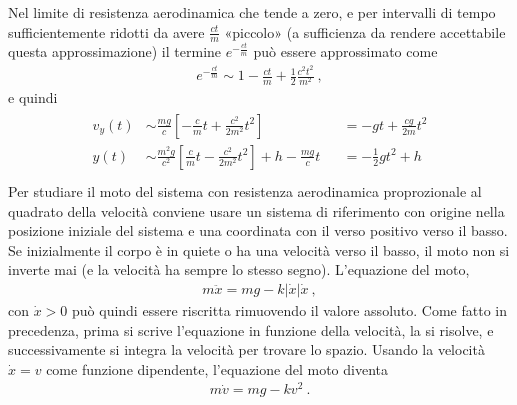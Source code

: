 \documentclass[letterpaper,10pt,italian]{jupyterBook}
\begin{document}
\sphinxAtStartPar
{} Nel limite di resistenza aerodinamica che tende a zero, e per intervalli di tempo sufficientemente ridotti da avere \(\frac{ct}{m}\) «piccolo» (a sufficienza da rendere accettabile questa approssimazione) il termine \(e^{-\frac{ct}{m}}\) può essere approssimato come
\begin{equation*}
\begin{split}e^{-\frac{ct}{m}} \sim 1 - \frac{ct}{m} + \frac{1}{2} \frac{c^2 t^2}{m^2} \ ,\end{split}
\end{equation*}
\sphinxAtStartPar
e quindi
\begin{equation*}
\begin{split}\begin{aligned}
  v_y(t) & \sim \frac{m g}{c} \left[ -\frac{c}{m} t + \frac{c^2}{2 m^2} t^2 \right] && = - g t + \frac{cg}{2m} t^2 \\
    y(t) & \sim \frac{m^2 g}{c^2} \left[ \frac{c}{m} t - \frac{c^2}{2 m^2} t^2 \right] + h - \frac{mg}{c}t && = - \frac{1}{2} g t^2 + h \\
\end{aligned}\end{split}
\end{equation*}
\sphinxAtStartPar
{}
Per studiare il moto del sistema con resistenza aerodinamica proprozionale al quadrato della velocità conviene usare un sistema di riferimento con origine nella posizione iniziale del sistema e una coordinata con il verso positivo verso il basso. Se inizialmente il corpo è in quiete o ha una velocità verso il basso, il moto non si inverte mai (e la velocità ha sempre lo stesso segno). L’equazione del moto,
\begin{equation*}
\begin{split}m \ddot{x} = m g - k |\dot{x}| \dot{x} \ ,\end{split}
\end{equation*}
\sphinxAtStartPar
con \(\dot{x} > 0\) può quindi essere riscritta rimuovendo il valore assoluto. Come fatto in precedenza, prima si scrive l’equazione in funzione della velocità, la si risolve, e successivamente si integra la velocità per trovare lo spazio. Usando la velocità \(\dot{x} = v\) come funzione dipendente, l’equazione del moto diventa
\begin{equation*}
\begin{split}m \dot{v} = m g - k v^2 \ .\end{split}
\end{equation*}
\end{document}
